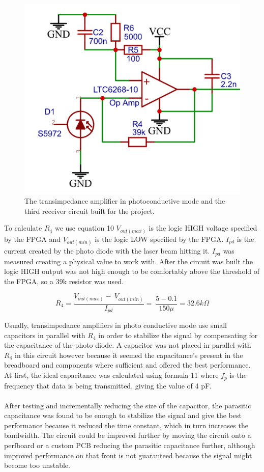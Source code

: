 \documentclass[conference]{IEEEtran}
\begin{document}
\begin{figure}[h!]
\includegraphics[width=0.8\linewidth]{fig 10.png}\par
\caption{The transimpedance amplifier in photoconductive mode and the third receiver circuit built for the project.}
\label{fig}
\end{figure}

To calculate $R_{4}$ we use equation 10 $V_{out(max)}$ is the logic HIGH voltage specified by the FPGA and $V_{out(min)}$ is the logic LOW specified by the FPGA. $I_{pd}$ is the current created by the photo diode with the laser beam hitting it. $I_{pd}$ was measured creating a physical value to work with. After the circuit was built the logic HIGH output was not high enough to be comfortably above the threshold of the FPGA, so a 39k resistor was used.

\begin{equation}
R_4=\frac{V_{out(max)}-\ V_{out(min)}}{I_{pd}}=\
\frac{5-0.1}{150\mu{}}=32.6k\Omega{}
\end{equation}

Usually, transimpedance amplifiers in photo conductive mode use small capacitors in parallel with $R_{4}$ in order to stabilize the signal by compensating for the capacitance of the photo diode. A capacitor was not placed in parallel with $R_{4}$ in this circuit however because it seemed the capacitance's present in the breadboard and components where sufficient and offered the best performance. At first, the ideal capacitance was calculated using formula 11 where $f_{p}$ is the frequency that data is being transmitted, giving the value of 4 pF. 
\\\\
After testing and incrementally reducing the size of the capacitor, the parasitic capacitance was found to be enough to stabilize the signal and give the best performance because it reduced the time constant, which in turn increases the bandwidth. The circuit could be improved further by moving the circuit onto a perfboard or a custom PCB reducing the parasitic capacitance further, although improved performance on that front is not guaranteed because the signal might become too unstable. 
\end{document}
